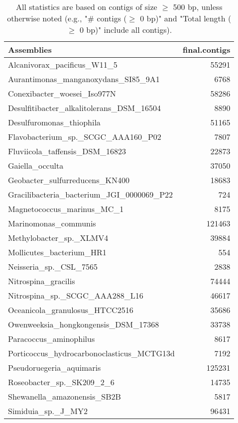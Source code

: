 \documentclass[12pt,a4paper]{article}
\begin{document}
\begin{table}[ht]
\begin{center}
\caption{All statistics are based on contigs of size $\geq$ 500 bp, unless otherwise noted (e.g., "\# contigs ($\geq$ 0 bp)" and "Total length ($\geq$ 0 bp)" include all contigs).}
\begin{tabular}{|l*{1}{|r}|}
\hline
Assemblies & final.contigs \\ \hline
Alcanivorax\_pacificus\_W11\_5 & 55291 \\ \hline
Aurantimonas\_manganoxydans\_SI85\_9A1 & 6768 \\ \hline
Conexibacter\_woesei\_Iso977N & 58286 \\ \hline
Desulfitibacter\_alkalitolerans\_DSM\_16504 & 8890 \\ \hline
Desulfuromonas\_thiophila & 51165 \\ \hline
Flavobacterium\_sp.\_SCGC\_AAA160\_P02 & 7807 \\ \hline
Fluviicola\_taffensis\_DSM\_16823 & 22873 \\ \hline
Gaiella\_occulta & 37050 \\ \hline
Geobacter\_sulfurreducens\_KN400 & 18683 \\ \hline
Gracilibacteria\_bacterium\_JGI\_0000069\_P22 & 724 \\ \hline
Magnetococcus\_marinus\_MC\_1 & 8175 \\ \hline
Marinomonas\_communis & 121463 \\ \hline
Methylobacter\_sp.\_XLMV4 & 39884 \\ \hline
Mollicutes\_bacterium\_HR1 & 554 \\ \hline
Neisseria\_sp.\_CSL\_7565 & 2838 \\ \hline
Nitrospina\_gracilis & 74444 \\ \hline
Nitrospina\_sp.\_SCGC\_AAA288\_L16 & 46617 \\ \hline
Oceanicola\_granulosus\_HTCC2516 & 35686 \\ \hline
Owenweeksia\_hongkongensis\_DSM\_17368 & 33738 \\ \hline
Paracoccus\_aminophilus & 8617 \\ \hline
Porticoccus\_hydrocarbonoclasticus\_MCTG13d & 7192 \\ \hline
Pseudoruegeria\_aquimaris & 125231 \\ \hline
Roseobacter\_sp.\_SK209\_2\_6 & 14735 \\ \hline
Shewanella\_amazonensis\_SB2B & 5817 \\ \hline
Simiduia\_sp.\_J\_MY2 & 96431 \\ \hline

\end{tabular}
\end{center}
\end{table}
\end{document}
